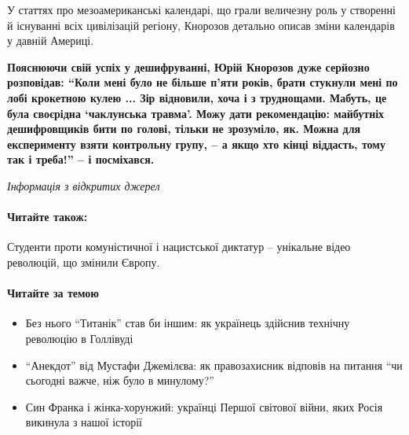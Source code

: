 У статтях про мезоамериканські календарі, що грали величезну роль у
створенні й існуванні всіх цивілізацій регіону, Кнорозов детально описав
зміни календарів у давній Америці.

\begin{leftbar}
        \bfseries
Пояснюючи свій успіх у дешифруванні, Юрій Кнорозов дуже серйозно
розповідав: \enquote{Коли мені було не більше п'яти років, брати стукнули мені
по лобі крокетною кулею ... Зір відновили, хоча і з труднощами. Мабуть,
це була своєрідна \enquote{чаклунська травма}. Можу дати рекомендацію: майбутніх
дешифровщиків бити по голові, тільки не зрозуміло, як. Можна для
експерименту взяти контрольну групу, – а якщо хто кінці віддасть, тому
так і треба!} – і посміхався.
\end{leftbar}

\emph{Інформація з відкритих джерел}

\paragraph{Читайте також:}

Студенти проти комуністичної і нацистської диктатур – унікальне відео революцій, що змінили Європу.

\paragraph{Читайте за темою}

\begin{itemize}
\item Без нього \enquote{Титанік} став би іншим: як українець здійснив технічну революцію в
Голлівуді

\item \enquote{Анекдот} від Мустафи Джемілєва: як правозахисник відповів на питання \enquote{чи
сьогодні важче, ніж було в минулому?}

\item Син Франка і жінка-хорунжий: українці Першої світової війни, яких Росія
        викинула з нашої історії
\end{itemize}

